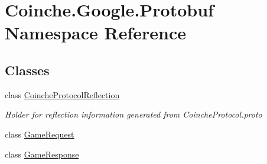 \hypertarget{namespace_coinche_1_1_google_1_1_protobuf}{}\section{Coinche.\+Google.\+Protobuf Namespace Reference}
\label{namespace_coinche_1_1_google_1_1_protobuf}
\subsection*{Classes}
\begin{DoxyCompactItemize}
\item 
class \hyperlink{class_coinche_1_1_google_1_1_protobuf_1_1_coinche_protocol_reflection}{Coinche\+Protocol\+Reflection}
\begin{DoxyCompactList}\small\item\em Holder for reflection information generated from Coinche\+Protocol.\+proto\end{DoxyCompactList}\item 
class \hyperlink{class_coinche_1_1_google_1_1_protobuf_1_1_game_request}{Game\+Request}
\item 
class \hyperlink{class_coinche_1_1_google_1_1_protobuf_1_1_game_response}{Game\+Response}
\end{DoxyCompactItemize}
